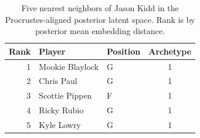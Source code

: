 \begin{table}[htbp]
  \centering\small
  \begin{tabular}{rllc}
    \toprule
    Rank & Player & Position & Archetype \\
    \midrule
    1 & Mookie Blaylock & G & 1 \\
    2 & Chris Paul & G & 1 \\
    3 & Scottie Pippen & F & 1 \\
    4 & Ricky Rubio & G & 1 \\
    5 & Kyle Lowry & G & 1 \\
    \bottomrule
  \end{tabular}
  \caption{Five nearest neighbors of Jason Kidd in the Procrustes-aligned posterior latent space. Rank is by posterior mean embedding distance.}
  \label{tab:Jason_Kidd_neighbors}
\end{table}


